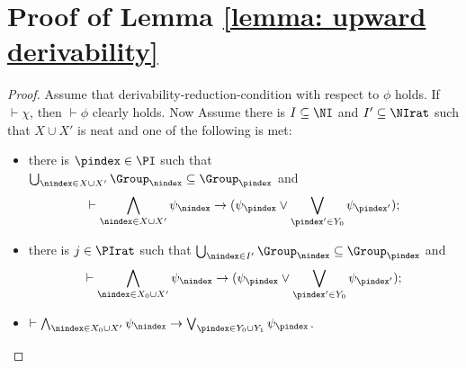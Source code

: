 \section{Proof of Lemma \ref{lemma: upward derivability}}
\label{section: upward derivability}
\begin{proof}
  Assume that derivability-reduction-condition with respect to $\phi $ holds. If $\vdash \chi $, then $\vdash \phi $ clearly holds. Now  Assume there is $I\subseteq \NI$ and $I' \subseteq \NIrat $ such that $X\cup X'$ is neat and one of the following is met:
  \begin{itemize}
    \item there is $\pindex\in \PI$ such that $\bigcup_{\nindex\in X\cup X'} \Group_\nindex \subseteq \Group_\pindex$ and $$\vdash \bigwedge_{\nindex\in X\cup X'} \psi_\nindex\to (\psi_\pindex\vee \bigvee_{\pindex'\in Y_0}\psi_{\pindex'});$$
    \item there is $j\in \PIrat$ such that $\bigcup_{\nindex\in I'} \Group_\nindex\subseteq \Group_\pindex$ and $$
    \vdash \bigwedge_{\nindex\in X_0\cup X'} \psi_\nindex \to (\psi_\pindex\vee \bigvee_{\pindex'\in Y_0}\psi_{\pindex'});$$
    \item $\vdash \bigwedge_{\nindex\in X_0\cup X'} \psi_\nindex \to \bigvee_{\pindex\in Y_0\cup Y_1}\psi_{\pindex}$.
  \end{itemize}
  

\end{proof}
